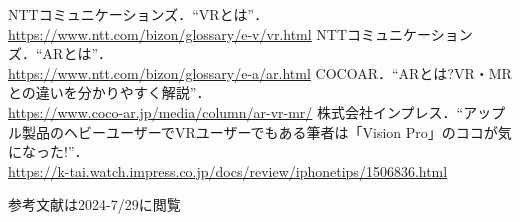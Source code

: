 \documentclass[titlepage,a4paper]{jsarticle}
\begin{document}
\begin{thebibliography}{99}
      NTTコミュニケーションズ．``VRとは''．\\
      \url{https://www.ntt.com/bizon/glossary/e-v/vr.html}
      NTTコミュニケーションズ．``ARとは''．\\
      \url{https://www.ntt.com/bizon/glossary/e-a/ar.html}
      COCOAR．``ARとは?VR・MRとの違いを分かりやすく解説''．\\
      \url{https://www.coco-ar.jp/media/column/ar-vr-mr/}
      株式会社インプレス．``アップル製品のヘビーユーザーでVRユーザーでもある筆者は「Vision Pro」のココが気になった!''．\\
      \url{https://k-tai.watch.impress.co.jp/docs/review/iphonetips/1506836.html}
\end{thebibliography}
参考文献は2024-7/29に閲覧
\end{document}
